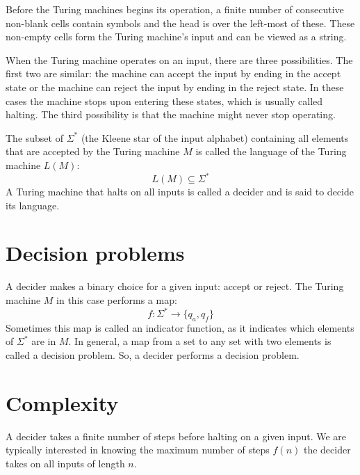   Before the Turing machines begins its operation, a finite number of consecutive non-blank cells contain symbols and the head is over the left-most of these.
  These non-empty cells form the Turing machine's input and can be viewed as a string.

  When the Turing machine operates on an input, there are three possibilities.
  The first two are similar: the machine can accept the input by ending in the accept state or the machine can reject the input by ending in the reject state.
  In these cases the machine stops upon entering these states, which is usually called halting.
  The third possibility is that the machine might never stop operating.
  
  The subset of \( \Sigma^* \) (the Kleene star of the input alphabet) containing all elements that are accepted by the Turing machine \( M \) is called the language of the Turing machine \( L(M) \):
  \[ L(M) \subseteq \Sigma^* \]
  A Turing machine that halts on all inputs is called a decider and is said to decide its language.

\section{Decision problems}
  A decider makes a binary choice for a given input: accept or reject.
  The Turing machine \( M \) in this case performs a map:
  \[ f:\Sigma^* \rightarrow \{ q_a, q_f \} \]
  Sometimes this map is called an indicator function, as it indicates which elements of \( \Sigma^* \) are in \( M \).
  In general, a map from a set to any set with two elements is called a decision problem.
  So, a decider performs a decision problem.

\section{Complexity}
  A decider takes a finite number of steps before halting on a given input.
  We are typically interested in knowing the maximum number of steps \( f(n) \) the decider takes on all inputs of length \( n \).
  
